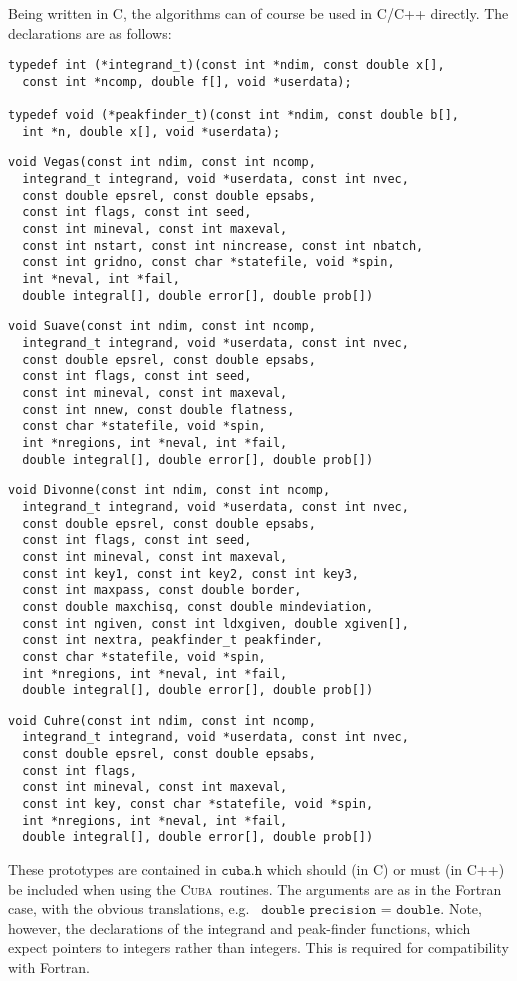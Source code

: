 \documentclass[12pt]{article}
\newcommand\cuba{\textsc{Cuba}}
\newcommand\eg{e.g.\ }
\newcommand\Code[1]{\ensuremath{\texttt{#1}}}
\begin{document}
Being written in C, the algorithms can of course be used in C/C++ 
directly.  The declarations are as follows:
\begin{verbatim}
typedef int (*integrand_t)(const int *ndim, const double x[],
  const int *ncomp, double f[], void *userdata);

typedef void (*peakfinder_t)(const int *ndim, const double b[],
  int *n, double x[], void *userdata);
\end{verbatim}
\begin{verbatim}
void Vegas(const int ndim, const int ncomp,
  integrand_t integrand, void *userdata, const int nvec,
  const double epsrel, const double epsabs,
  const int flags, const int seed,
  const int mineval, const int maxeval,
  const int nstart, const int nincrease, const int nbatch,
  const int gridno, const char *statefile, void *spin,
  int *neval, int *fail,
  double integral[], double error[], double prob[])
\end{verbatim}
\begin{verbatim}
void Suave(const int ndim, const int ncomp,
  integrand_t integrand, void *userdata, const int nvec,
  const double epsrel, const double epsabs,
  const int flags, const int seed,
  const int mineval, const int maxeval,
  const int nnew, const double flatness,
  const char *statefile, void *spin,
  int *nregions, int *neval, int *fail,
  double integral[], double error[], double prob[])
\end{verbatim}
\begin{verbatim}
void Divonne(const int ndim, const int ncomp,
  integrand_t integrand, void *userdata, const int nvec,
  const double epsrel, const double epsabs,
  const int flags, const int seed,
  const int mineval, const int maxeval,
  const int key1, const int key2, const int key3,
  const int maxpass, const double border,
  const double maxchisq, const double mindeviation,
  const int ngiven, const int ldxgiven, double xgiven[],
  const int nextra, peakfinder_t peakfinder,
  const char *statefile, void *spin,
  int *nregions, int *neval, int *fail,
  double integral[], double error[], double prob[])
\end{verbatim}
\begin{verbatim}
void Cuhre(const int ndim, const int ncomp,
  integrand_t integrand, void *userdata, const int nvec,
  const double epsrel, const double epsabs,
  const int flags,
  const int mineval, const int maxeval,
  const int key, const char *statefile, void *spin,
  int *nregions, int *neval, int *fail,
  double integral[], double error[], double prob[])
\end{verbatim}
These prototypes are contained in \Code{cuba.h} which should (in C) or
must (in C++) be included when using the \cuba\ routines.  The arguments
are as in the Fortran case, with the obvious translations, \eg
\Code{double precision} = \Code{double}.  Note, however, the
declarations of the integrand and peak-finder functions, which expect
pointers to integers rather than integers.  This is required for
compatibility with Fortran.
\end{document}
